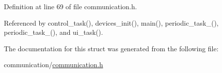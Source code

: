 Definition at line 69 of file communication.\-h.



Referenced by control\-\_\-task(), devices\-\_\-init(), main(), periodic\-\_\-task\-\_(), periodic\-\_\-task\-\_(), and ui\-\_\-task().



The documentation for this struct was generated from the following file\-:\begin{DoxyCompactItemize}
\item 
communication/\hyperlink{communication_8h}{communication.\-h}\end{DoxyCompactItemize}
